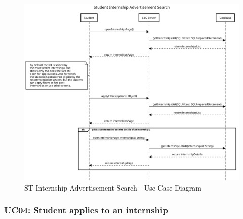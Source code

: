 \begin{figure}[H]
    \centering
    \includegraphics[width=1.0\textwidth]{Images/UC_3.pdf}
    \caption{ST Internship Advertisement Search - Use Case Diagram}
    \label{fig:use-case-diagram-3}
\end{figure}


\subsubsection{UC04: Student applies to an internship}
\label{subsubsec:student-applies-to-an-internship}

